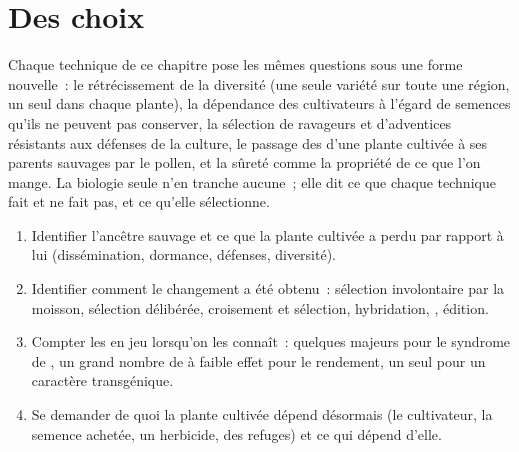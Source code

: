 \section{Des choix}

\begin{proposition}\label{prop:g12:domesticated-plants:stakes}
Chaque technique de ce chapitre pose les mêmes questions sous une
forme nouvelle~: le rétrécissement de la diversité (une seule variété
sur toute une région, un seul  dans chaque plante), la dépendance
des cultivateurs à l'égard de semences qu'ils ne peuvent pas
conserver, la sélection de ravageurs et d'adventices résistants aux
défenses de la culture, le passage des  d'une plante cultivée à
ses parents sauvages par le pollen, et la sûreté comme la propriété de
ce que l'on mange. La biologie seule n'en tranche aucune~; elle dit ce
que chaque technique fait et ne fait pas, et ce qu'elle sélectionne.
\end{proposition}
\admitted

\begin{method}\label{met:g12:domesticated-plants:read}
\begin{enumerate}
  \item Identifier l'ancêtre sauvage et ce que la plante cultivée a
        perdu par rapport à lui (dissémination, dormance, défenses,
        diversité).
  \item Identifier comment le changement a été obtenu~: sélection
        involontaire par la moisson, sélection délibérée, croisement
        et sélection, hybridation, , édition.
  \item Compter les  en jeu lorsqu'on les connaît~: quelques
         majeurs pour le syndrome de , un grand
        nombre de  à faible effet pour le rendement, un seul pour
        un caractère transgénique.
  \item Se demander de quoi la plante cultivée dépend désormais (le
        cultivateur, la semence achetée, un herbicide, des refuges) et
        ce qui dépend d'elle.
\end{enumerate}
\end{method}

